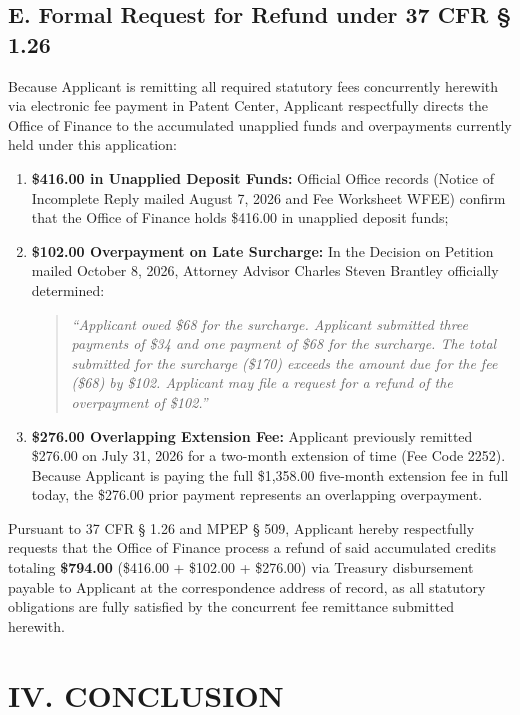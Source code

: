 \documentclass[11pt,letterpaper]{article}
\begin{document}
\subsection*{E. Formal Request for Refund under 37 CFR \S{} 1.26}
Because Applicant is remitting all required statutory fees concurrently herewith via electronic fee payment in Patent Center, Applicant respectfully directs the Office of Finance to the accumulated unapplied funds and overpayments currently held under this application:
\begin{enumerate}[leftmargin=*]
    \item \textbf{\$416.00 in Unapplied Deposit Funds:} Official Office records (Notice of Incomplete Reply mailed August 7, 2026 and Fee Worksheet WFEE) confirm that the Office of Finance holds \$416.00 in unapplied deposit funds;
    \item \textbf{\$102.00 Overpayment on Late Surcharge:} In the Decision on Petition mailed October 8, 2026, Attorney Advisor Charles Steven Brantley officially determined:
    \begin{quote}
    \textit{``Applicant owed \$68 for the surcharge. Applicant submitted three payments of \$34 and one payment of \$68 for the surcharge. The total submitted for the surcharge (\$170) exceeds the amount due for the fee (\$68) by \$102. Applicant may file a request for a refund of the overpayment of \$102.''}
    \end{quote}
    \item \textbf{\$276.00 Overlapping Extension Fee:} Applicant previously remitted \$276.00 on July 31, 2026 for a two-month extension of time (Fee Code 2252). Because Applicant is paying the full \$1,358.00 five-month extension fee in full today, the \$276.00 prior payment represents an overlapping overpayment.
\end{enumerate}

Pursuant to 37 CFR \S{} 1.26 and MPEP \S{} 509, Applicant hereby respectfully requests that the Office of Finance process a refund of said accumulated credits totaling \textbf{\$794.00} (\$416.00 + \$102.00 + \$276.00) via Treasury disbursement payable to Applicant at the correspondence address of record, as all statutory obligations are fully satisfied by the concurrent fee remittance submitted herewith.

\section*{IV. CONCLUSION}
\end{document}
